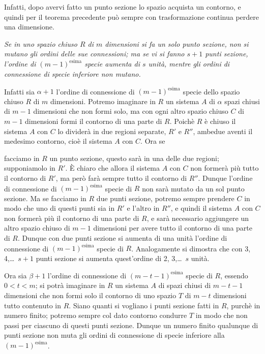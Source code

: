 \documentclass{article}
\begin{document}
Infatti, dopo avervi fatto un punto sezione lo spazio acquista un contorno, e quindi per il teorema precedente può sempre con trasformazione continua perdere una dimensione.

\emph{Se in uno spazio chiuso $R$ di $m$ dimensioni si fa un solo punto sezione, non si mutano gli ordini delle sue connessioni; ma se vi si fanno $s+1$ punti sezione, l'ordine di $(m-1)^{\text{esima}}$ specie aumenta di $s$ unità, mentre gli ordini di connessione di specie inferiore non mutano.}

Infatti sia $\alpha+1$ l'ordine di connessione di $(m-1)^{\text{esima}}$ specie dello spazio chiuso $R$ di $m$ dimensioni. Potremo imaginare in $R$ un sistema $A$ di $\alpha$ spazi chiusi di $m-1$ dimensioni che non formi solo, ma con ogni altro spazio chiuso $C$ di $m-1$ dimensioni formi il contorno di una parte di $R$. Poichè $R$ è chiuso il sistema $A$ con $C$ lo dividerà in due regioni separate, $R'$ e $R''$, ambedue aventi il medesimo contorno, cioè il sistema $A$ con $C$. Ora se

facciamo in $R$ un punto sezione, questo sarà in una delle due regioni; supponiamolo in $R'$. È chiaro che allora il sistema $A$ con $C$ non formerà più tutto il contorno di $R'$, ma però farà sempre tutto il contorno di $R''$. Dunque l'ordine di connessione di $(m-1)^{\text{esima}}$ specie di $R$ non sarà mutato da un sol punto sezione. Ma se facciamo in $R$ due punti sezione, potremo sempre prendere $C$ in modo che uno di questi punti sia in $R'$ e l'altro in $R''$, e quindi il sistema $A$ con $C$ non formerà più il contorno di una parte di $R$, e sarà necessario aggiungere un altro spazio chiuso di $m-1$ dimensioni per avere tutto il contorno di una parte di $R$. Dunque con due punti sezione si aumenta di una unità l'ordine di connessione di $(m-1)^{\text{esima}}$ specie di $R$. Analogamente si dimostra che con 3, 4,\ldots\ $s+1$ punti sezione si aumenta quest'ordine di 2, 3,\ldots\ $s$ unità.

Ora sia $\beta+1$ l'ordine di connessione di $(m-t-1)^{\text{esima}}$ specie di $R$, essendo $0 < t < m$; si potrà imaginare in $R$ un sistema $A$ di spazi chiusi di $m-t-1$ dimensioni che non formi solo il contorno di uno spazio $T$ di $m-t$ dimensioni tutto contenuto in $R$. Siano quanti si vogliano i punti sezione fatti in $R$, purchè in numero finito; potremo sempre col dato contorno condurre $T$ in modo che non passi per ciascuno di questi punti sezione. Dunque un numero finito qualunque di punti sezione non muta gli ordini di connessione di specie inferiore alla $(m-1)^{\text{esima}}$.
\end{document}
